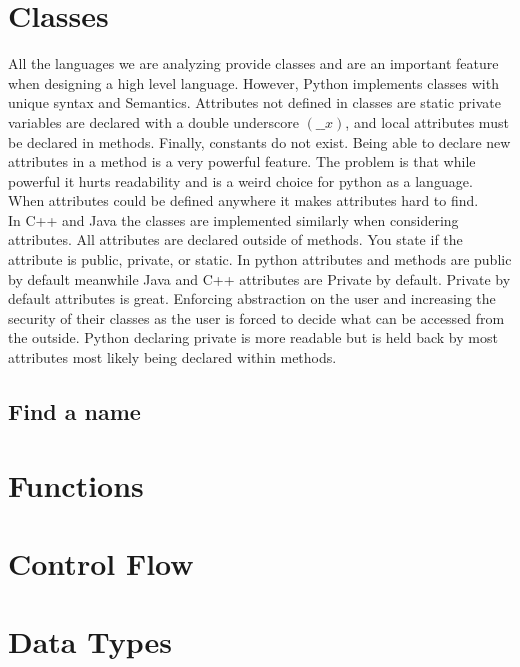 \documentclass[sigconf, nonacm, authorversion, language=english, 12pt]{acmart}
\begin{document}
\section{Classes}

All the languages we are analyzing provide classes and are an important feature when designing a high level language. However, Python implements classes with unique
syntax and Semantics. Attributes not defined in classes are static private variables are declared with a double underscore $(\_\_x)$, and local
attributes must be declared in methods. Finally, constants do not exist. Being able to declare new attributes in a method is a very powerful feature.
The problem is that while powerful it hurts readability and is a weird choice for python as a language. When attributes could be defined anywhere it makes attributes hard to find.\\

In C++ and Java the classes are implemented similarly when considering attributes. All attributes are declared outside of methods. You state if the attribute is public, private, or static.
In python attributes and methods are public by default meanwhile Java and C++ attributes are Private by default. Private by default attributes is great. Enforcing abstraction on the user and
increasing the security of their classes as the user is forced to decide what can be accessed from the outside. Python declaring private is more readable but is held back by most attributes
most likely being declared within methods.\\

\subsection*{Find a name}


\section{Functions}

\section{Control Flow}


\section{Data Types}

\end{document}
